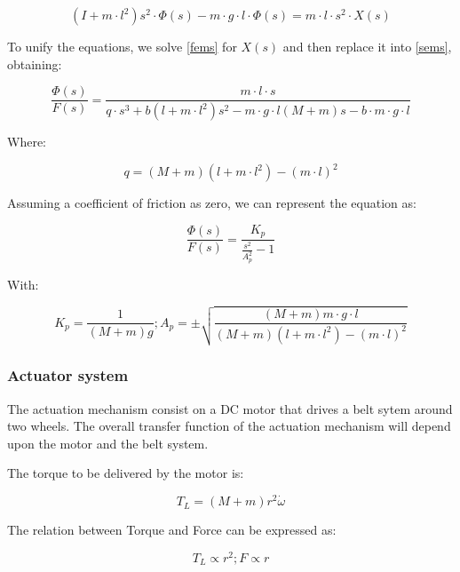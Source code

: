 \documentclass{article}
\begin{document}
\begin{equation} \label{sems}
(I+m\cdot l^2)s^2\cdot \Phi(s)-m\cdot g\cdot l\cdot \Phi(s)=m\cdot l\cdot s^2\cdot X(s)
\end{equation}

To unify the equations, we solve \ref{fems} for $X(s)$ and then replace it into \ref{sems}, obtaining:

\begin{equation} \label{ecms}
\frac{\Phi(s)}{F(s)}=\frac{m\cdot l\cdot s}{q\cdot s^3+b(l+m\cdot l^2)s^2-m\cdot g\cdot l(M+m)s-b\cdot m\cdot g\cdot l}
\end{equation}

Where:

\begin{equation} \label{dq}
q=(M+m)(l+m\cdot l^2)-(m\cdot l)^2
\end{equation}

Assuming a coefficient of friction as zero, we can represent the equation as:

\begin{equation} \label{efms}
\frac{\Phi(s)}{F(s)}=\frac{K_p}{\frac{s^2}{A_p^2}-1}
\end{equation}

With:

\begin{equation} \label{dka}
K_p=\frac{1}{(M+m)g} ; A_p=\pm \sqrt{\frac{(M+m)m\cdot g\cdot l}{(M+m)(l+m\cdot l^2)-(m\cdot l)^2}}
\end{equation}

\subsubsection{Actuator system}

The actuation mechanism consist on a DC motor that drives a belt sytem around two wheels. The overall transfer function of the actuation mechanism will depend upon the motor and the belt system.

The torque to be delivered by the motor is:

\begin{equation} \label{t}
T_L=(M+m)r^2\dot{\omega}
\end{equation}

The relation between Torque and Force can be expressed as:

\begin{equation} \label{dtf}
T_L\propto r^2 ; F\propto r
\end{equation}
\end{document}
